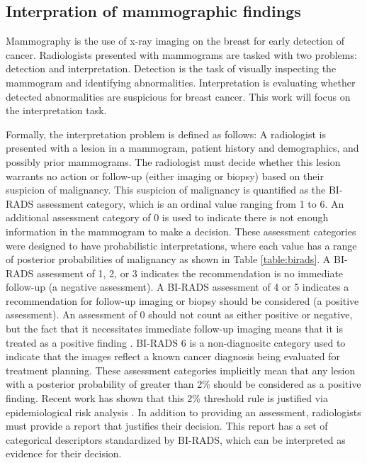 
\subsection{Interpration of mammographic findings}
Mammography is the use of x-ray imaging on the breast for early detection of cancer. Radiologists presented with mammograms are tasked with two problems: detection and interpretation. Detection is the task of visually inspecting the mammogram and identifying abnormalities. Interpretation is evaluating whether detected abnormalities are suspicious for breast cancer. This work will focus on the interpretation task.

Formally, the interpretation problem is defined as follows: A radiologist is presented with a lesion in a mammogram, patient history and demographics, and possibly prior mammograms. The radiologist must decide whether this lesion warrants no action or follow-up (either imaging or biopsy) based on their suspicion of malignancy. This suspicion of malignancy is quantified as the BI-RADS assessment category, which is an ordinal value ranging from 1 to 6. An additional assessment category of 0 is used to indicate there is not enough information in the mammogram to make a decision. These assessment categories were designed to have probabilistic interpretations, where each value has a range of posterior probabilities of malignancy as shown in Table \ref{table:birads}. A BI-RADS assessment of 1, 2, or 3 indicates the recommendation is no immediate follow-up (a negative assessment). A BI-RADS assessment of 4 or 5 indicates a recommendation for follow-up imaging or biopsy should be considered (a positive assessment). An assessment of 0 should not count as either positive or negative, but the fact that it necessitates immediate follow-up imaging means that it is treated as a positive finding \cite{Barlow:2004cy}. BI-RADS 6 is a non-diagnositc category used to indicate that the images reflect a known cancer diagnosis being evaluated for treatment planning. These assessment categories implicitly mean that any lesion with a posterior probability of greater than 2\% should be considered as a positive finding. Recent work has shown that this 2\% threshold rule is justified via epidemiological risk analysis \cite{Burnside:2012fk}. In addition to providing an assessment, radiologists must provide a report that justifies their decision. This report has a set of categorical descriptors standardized by BI-RADS, which can be interpreted as evidence for their decision.

